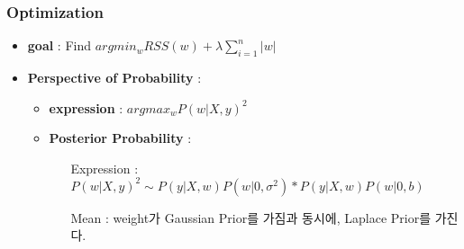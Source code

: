 \documentclass{article}
\begin{document}
\subsubsection{Optimization}
\begin{itemize}
    \item \textbf{goal} : Find $argmin_w RSS(w)+\lambda\sum_{i=1}^{n}{|w|}$
    \item \textbf{Perspective of Probability} : 
         \begin{itemize}
             \item \textbf{expression} : $argmax_w P(w|X,y)^2$
             \item \textbf{Posterior Probability} : 
                \begin{itemize}
                    \item[Expression] : $P(w|X,y)^2 \sim {P(y|X,w)P(w|0,\sigma^2)}*{P(y|X,w)P(w|0,b)}$
                    \item[Mean] : weight가 Gaussian Prior를 가짐과 동시에, Laplace Prior를 가진다.
                \end{itemize}
             

\end{itemize}
\end{itemize}
\end{document}
